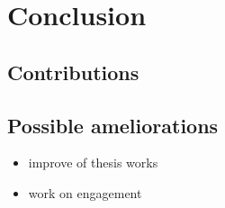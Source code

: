 \documentclass[english, a4paper,11pt,twoside]{StyleThese}
\begin{document}
\fi


\chapter*{Conclusion}


\section*{Contributions}

\section*{Possible ameliorations}

\begin{itemize}
\item improve of thesis works
\item work on engagement
\end{itemize}

\ifdefined{}
\else


\end{document}
